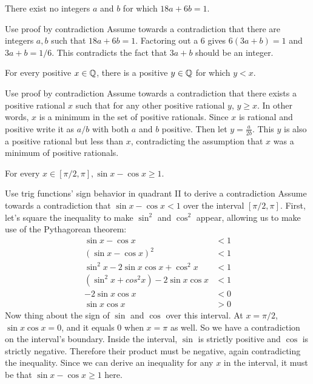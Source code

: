 \documentclass{article}
\begin{document}
\begin{problem}
There exist no integers $a$ and $b$ for which $18a + 6b = 1$.
\end{problem}
\begin{solution}{Use proof by contradiction}
  Assume towards a contradiction that there are integers $a, b$ such that $18a + 6b = 1$. Factoring out a 6 gives $6(3a + b) = 1$ and $3a + b = 1/6$. This contradicts the fact that $3a + b$ should be an integer.
\end{solution}

\begin{problem}
For every positive $x \in \mathbb{Q}$, there is a positive $y \in \mathbb{Q}$ for which $y < x$.
\end{problem}
\begin{solution}{Use proof by contradiction}
  Assume towards a contradiction that there exists a positive rational $x$ such that for any other positive rational $y$, $y \geq x$. In other words, $x$ is a minimum in the set of positive rationals. Since $x$ is rational and positive write it as $a/b$ with both $a$ and $b$ positive. Then let $y = \frac{a}{2b}$. This $y$ is also a positive rational but less than $x$, contradicting the assumption that $x$ was a minimum of positive rationals.
\end{solution}

\begin{problem}
For every $x \in [\pi/2, \pi], \sin x - \cos x \geq 1$.
\end{problem}
\begin{solution}{Use trig functions' sign behavior in quadrant II to derive a contradiction}
  Assume towards a contradiction that $\sin x - \cos x < 1$ over the interval $[\pi/2, \pi]$. First, let's square the inequality to make $\sin^2$ and $\cos^2$ appear, allowing us to make use of the Pythagorean theorem:
  \begin{align*}
    \sin x - \cos x                       & < 1 \\
    (\sin x - \cos x)^2                   & < 1 \\
    \sin^2 x - 2\sin x \cos x + \cos^2 x  & < 1 \\
    (\sin^2 x + cos^2 x) - 2\sin x \cos x & < 1 \\
    -2\sin x \cos x                       & < 0 \\
    \sin x \cos x                         & > 0
  \end{align*}
  Now thing about the sign of $\sin$ and $\cos$ over this interval. At $x = \pi / 2$, $\sin x \cos x = 0$, and it equals 0 when $x = \pi$ as well. So we have a contradiction on the interval's boundary. Inside the interval, $\sin$ is strictly positive and $\cos$ is strictly negative. Therefore their product must be negative, again contradicting the inequality. Since we can derive an inequality for any $x$ in the interval, it must be that $\sin x - \cos x \geq 1$ here.
\end{solution}
\end{document}
